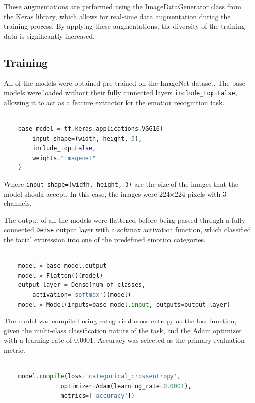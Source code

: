 These augmentations are performed using the ImageDataGenerator class from the Keras library, which allows for real-time data augmentation during the training process. By applying these augmentations, the diversity of the training data is significantly increased.

\subsection{Training}

All of the models were obtained pre-trained on the ImageNet dataset. The base models were loaded without their fully connected layers \texttt{include\_top=False}, allowing it to act as a feature extractor for the emotion recognition task.

\begin{lstlisting}[language=Python, basicstyle=\ttfamily\footnotesize]

    base_model = tf.keras.applications.VGG16(
        input_shape=(width, height, 3),
        include_top=False,
        weights="imagenet"
    )

\end{lstlisting}

Where \texttt{input\_shape=(width, height, 3)} are the size of the images that the model should accept. In this case, the images were 224\(\times\)224 pixels with 3 channels.

The output of all the models were flattened before being passed through a fully connected \texttt{Dense} output layer with a softmax activation function, which classified the facial expression into one of the predefined emotion categories.
\begin{lstlisting}[language=Python, basicstyle=\ttfamily\footnotesize]

    model = base_model.output
    model = Flatten()(model)
    output_layer = Dense(num_of_classes,
        activation='softmax')(model)
    model = Model(inputs=base_model.input, outputs=output_layer)

\end{lstlisting}

The model was compiled using categorical cross-entropy as the loss function, given the multi-class classification nature of the task, and the Adam optimizer with a learning rate of 0.0001. Accuracy was selected as the primary evaluation metric.

\begin{lstlisting}[language=Python, basicstyle=\ttfamily\footnotesize]

    model.compile(loss='categorical_crossentropy',
                optimizer=Adam(learning_rate=0.0001),
                metrics=['accuracy'])

\end{lstlisting}

